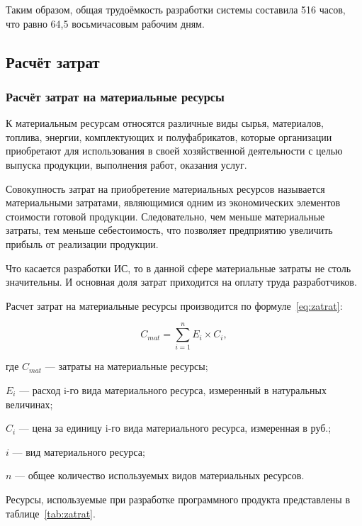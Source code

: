 Таким образом, общая трудоёмкость разработки системы составила 516 часов, что равно 64,5 восьмичасовым рабочим дням.

\subsection{Расчёт затрат}

\subsubsection{Расчёт затрат на материальные ресурсы}

К материальным ресурсам относятся различные виды сырья, материалов, топлива, энергии, комплектующих и полуфабрикатов, которые организации приобретают для использования в своей хозяйственной деятельности с целью выпуска продукции, выполнения работ, оказания услуг.

Совокупность затрат на приобретение материальных ресурсов называется материальными затратами, являющимися одним из экономических элементов стоимости готовой продукции.
Следовательно, чем меньше материальные затраты, тем меньше себестоимость, что позволяет предприятию увеличить прибыль от реализации продукции.

Что касается разработки ИС, то в данной сфере материальные затраты не столь значительны.
И основная доля затрат приходится на оплату труда разработчиков.

Расчет затрат на материальные ресурсы производится по формуле~\ref{eq:zatrat}:

\begin{equation}
	\label{eq:zatrat}
	C_{mat} = \sum^{n}_{i=1} E_{i} \times C_{i},
\end{equation}
\begin{ESKDexplanation}
	\item где $C_{mat}$ --- затраты на материальные ресурсы;
	\item $E_{i}$ --- расход i-го вида материального ресурса, измеренный в натуральных величинах;
	\item $C_{i}$ ---  цена за единицу i-го вида материального ресурса, измеренная в руб.;
	\item $i$ --- вид материального ресурса;
	\item $n$ --- общее количество используемых видов материальных ресурсов.
\end{ESKDexplanation}

Ресурсы, используемые при разработке программного продукта представлены в таблице~\ref{tab:zatrat}. 

